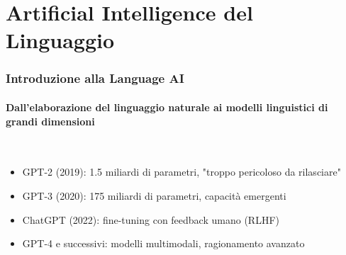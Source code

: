 \section{Artificial Intelligence del Linguaggio} %
\label{sec:language_ai}
%
\begin{frame}[t,fragile] \frametitle{Introduzione alla Language AI}
	{\scriptsize
		\onslide<1->
            \framesubtitle{Dall'elaborazione del linguaggio naturale ai modelli linguistici di grandi dimensioni}
            \vspace*{-15pt}
             \begin{minipage}[t]{\textwidth}
            \end{minipage}
            \\\vspace*{3pt}
	    	\begin{minipage}[t]{\textwidth}
				\begin{minipage}[t]{0.6\textwidth}
	    			\begin{itemize}[leftmargin=10pt,align=right]
						\onslide<2->\item[\alert{\faHandORight}] \alert{GPT-2 (2019):} 1.5 miliardi di parametri, "troppo pericoloso da rilasciare"
						\onslide<3->\item[\alert{\faHandORight}] \alert{GPT-3 (2020):} 175 miliardi di parametri, capacità emergenti
						\onslide<4->\item[\alert{\faHandORight}] \alert{ChatGPT (2022):} fine-tuning con feedback umano (RLHF)
						\onslide<5->\item[\alert{\faHandORight}] \alert{GPT-4 e successivi:} modelli multimodali, ragionamento avanzato
					\end{itemize}
            	\end{minipage}
            	\begin{minipage}[t]{0.4\textwidth}
            	\end{minipage}
	    	\end{minipage}
	}
\end{frame}
